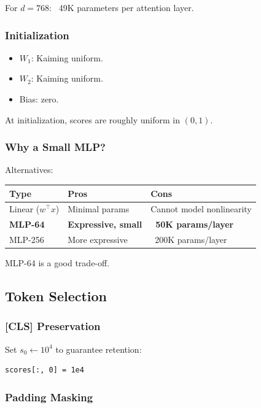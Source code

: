 For $d = 768$: ~49K parameters per attention layer.

\subsubsection{Initialization}

\begin{itemize}
\item $W_1$: Kaiming uniform.
\item $W_2$: Kaiming uniform.
\item Bias: zero.

\end{itemize}
At initialization, scores are roughly uniform in $(0, 1)$.

\subsubsection{Why a Small MLP?}

Alternatives:

\begin{table}[H]
\centering
\small
\begin{tabular}{lll}
\toprule
\textbf{Type} & \textbf{Pros} & \textbf{Cons} \\
\midrule
Linear ($w^\top x$) & Minimal params & Cannot model nonlinearity \\
\textbf{MLP-64} & \textbf{Expressive, small} & \textbf{~50K params/layer} \\
MLP-256 & More expressive & ~200K params/layer \\
\bottomrule
\end{tabular}
\end{table}

MLP-64 is a good trade-off.

\subsection{Token Selection}

\subsubsection{[CLS] Preservation}

Set $s_0 \leftarrow 10^4$ to guarantee retention:

\begin{lstlisting}
scores[:, 0] = 1e4
\end{lstlisting}

\subsubsection{Padding Masking}

